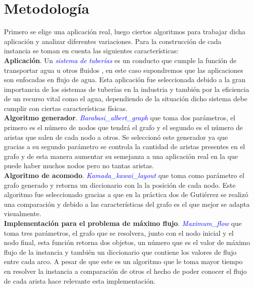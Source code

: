 \documentclass[12pt]{article}
\begin{document}

 \label{c4}


\newpage
\section{Metodología}
Primero se elige una aplicación real, luego ciertos algoritmos para trabajar dicha aplicación y analizar diferentes variaciones. Para la construcción de cada instancia se toman en cuenta las siguientes características: \\

\textbf{Aplicación}. Un \textcolor{blue}{\textit{sistema de tuberías}} es un conducto que cumple la función de transportar agua u otros fluidos \cite{Flu}, en este caso supondremos que las aplicaciones son enfocadas en flujo de agua. Esta aplicación fue seleccionada debido a la gran importancia de los sistemas de tuberías en la industria y también por la eficiencia de un recurso vital como el agua, dependiendo de la situación dicho sistema debe cumplir con ciertas características físicas.  \\

\textbf{Algoritmo generador}. \textcolor{blue}{\textit{Barabasi\_albert\_graph}} que toma dos parámetros, el primero es el número de nodos que tendrá el grafo y el segundo es el número de aristas que salen de cada nodo a otros. Se seleccionó este generador ya que gracias a su segundo parámetro se controla la cantidad de aristas presentes en el grafo y de esta manera aumentar su semejanza a una aplicación real en la que puede haber muchos nodos pero no tantas aristas. \\

\textbf{Algoritmo de acomodo}. \textcolor{blue}{\textit{Kamada\_kawai\_layout}} que toma como parámetro el grafo generado y retorna un diccionario con la la posición de cada nodo. Este algoritmo fue seleccionado gracias a que en la práctica dos de Gutiérrez \cite{Mar} se realizó una comparación y debido a las características del grafo es el que mejor se adapta visualmente. \\

\textbf{Implementación para el problema de máximo flujo}. \textcolor{blue}{\textit{Maximum\_flow}} que toma tres parámetros, el grafo que se resolvera, junto con el nodo inicial y el nodo final, esta función retorna dos objetos, un número que es el valor de máximo flujo de la instancia y también un diccionario que contiene los valores de flujo entre cada arco. A pesar de que este es un algoritmo que le toma mayor tiempo en resolver la instancia a comparación de otros el hecho de poder conocer el flujo de cada arista hace relevante esta implementación.  \\
\end{document}
